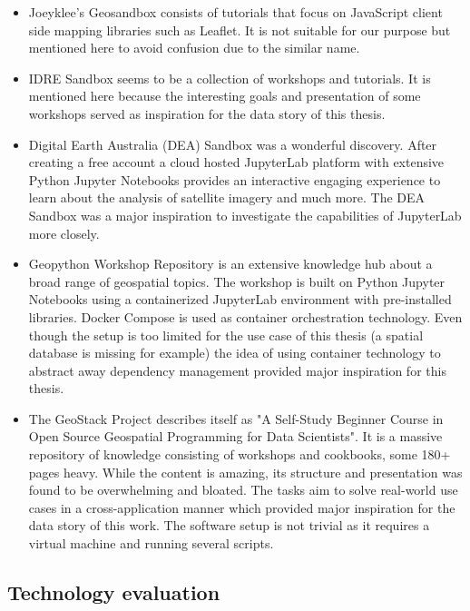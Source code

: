 \documentclass[11pt, a4paper, oneside, parskip=full-]{scrartcl}
\begin{document}
\begin{itemize}
  \item Joeyklee's Geosandbox\cite{project-joeyklee} consists of tutorials that
  focus on JavaScript client side mapping libraries such as Leaflet. It is not
  suitable for our purpose but mentioned here to avoid confusion due to the
  similar name.
  \item IDRE Sandbox\cite{project-idre} seems to be a collection of workshops
  and tutorials. It is mentioned here because the interesting goals and
  presentation of some workshops served as inspiration for the data story of
  this thesis.
  \item Digital Earth Australia (DEA) Sandbox\cite{project-dea} was a wonderful
  discovery. After creating a free account a cloud hosted
  JupyterLab\cite{jupyterlab} platform with extensive Python Jupyter Notebooks
  provides an interactive engaging experience to learn about the analysis of
  satellite imagery and much more. The DEA Sandbox was a major inspiration to
  investigate the capabilities of JupyterLab more closely.
  \item Geopython Workshop Repository\cite{project-geopython} is an extensive
  knowledge hub about a broad range of geospatial topics. The workshop is built
  on Python Jupyter Notebooks using a containerized JupyterLab environment with
  pre-installed libraries. Docker Compose\cite{dockercompose} is used as
  container orchestration technology. Even though the setup is too limited for
  the use case of this thesis (a spatial database is missing for example) the
  idea of using container technology to abstract away dependency management
  provided major inspiration for this thesis.
  \item The GeoStack Project\cite{project-geostack} describes itself as "A
  Self-Study Beginner Course in Open Source Geospatial Programming for Data
  Scientists". It is a massive repository of knowledge consisting of workshops
  and cookbooks, some 180+ pages heavy. While the content is amazing, its
  structure and presentation was found to be overwhelming and bloated. The tasks
  aim to solve real-world use cases in a cross-application manner which provided
  major inspiration for the data story of this work. The software setup is not
  trivial as it requires a virtual machine and running several scripts.
\end{itemize}

\subsection{Technology evaluation}
\end{document}
